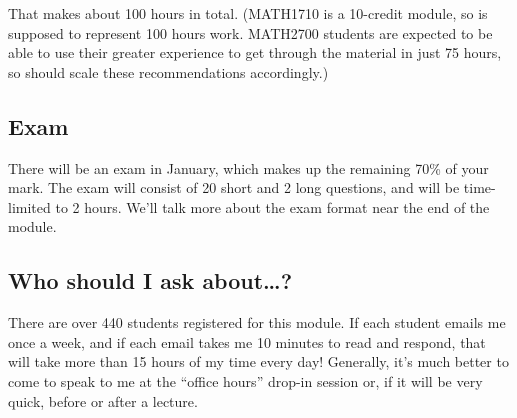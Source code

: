 \documentclass[
  a4paper,
]{book}
\theoremstyle{definition}
\theoremstyle{definition}
\theoremstyle{definition}
\theoremstyle{definition}
\theoremstyle{remark}
\begin{document}
That makes about 100 hours in total. (MATH1710 is a 10-credit module, so is supposed to represent 100 hours work. MATH2700 students are expected to be able to use their greater experience to get through the material in just 75 hours, so should scale these recommendations accordingly.)

\hypertarget{exam}{%
\subsection*{Exam}\label{exam}}

There will be an exam in January, which makes up the remaining 70\% of your mark. The exam will consist of 20 short and 2 long questions, and will be time-limited to 2 hours. We'll talk more about the exam format near the end of the module.

\hypertarget{ask}{%
\subsection*{Who should I ask about\ldots?}\label{ask}}

There are over 440 students registered for this module. If each student emails me once a week, and if each email takes me 10 minutes to read and respond, that will take more than 15 hours of my time every day! Generally, it's much better to come to speak to me at the ``office hours'' drop-in session or, if it will be very quick, before or after a lecture.
\end{document}
